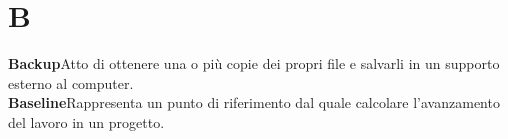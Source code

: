 \newpage
\section{B}\label{l:B}
\textbf{Backup}\newline Atto di ottenere una o più copie dei propri file e salvarli in un supporto esterno al computer.\\
\newline
\textbf{Baseline}\newline Rappresenta un punto di riferimento dal quale calcolare l'avanzamento del lavoro in un progetto.

